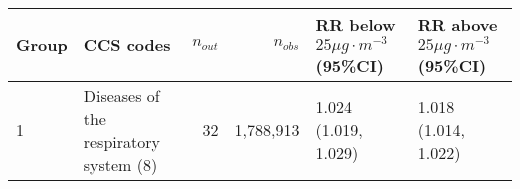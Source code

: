 \begin{tabular}{lp{6.5cm}rrp{2.2cm}p{2.2cm}}
  \hline
Group & CCS codes & $n_{out}$ & $n_{obs}$ & RR below $25 \mu g \cdot m^{-3}$ (95\%CI) & RR above $25 \mu g \cdot m^{-3}$ (95\%CI) \\ 
  \hline
   1 & Diseases of the respiratory system (8) &   32 & 1,788,913 & 1.024 (1.019, 1.029) & 1.018 (1.014, 1.022) \\ 
   \hline
\end{tabular}

